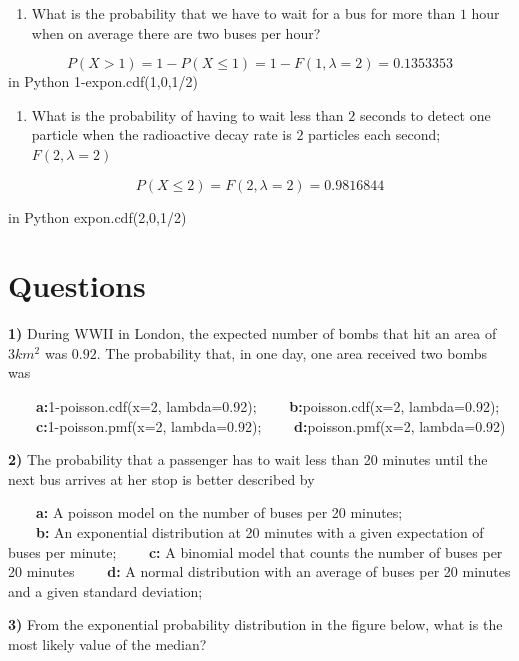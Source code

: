 \documentclass[
]{book}
\providecommand{\tightlist}{%
  \setlength{\itemsep}{0pt}\setlength{\parskip}{0pt}}
\begin{document}
\begin{enumerate}
\def\labelenumi{\arabic{enumi})}
\tightlist
\item
  What is the probability that we have to wait for a bus for more than \(1\) hour when on average there are two buses per hour?
\end{enumerate}

\[P(X > 1)=1-P(X \le 1) = 1-F(1,\lambda=2)=0.1353353\]
in Python 1-expon.cdf(1,0,1/2)

\begin{enumerate}
\def\labelenumi{\arabic{enumi})}
\setcounter{enumi}{1}
\tightlist
\item
  What is the probability of having to wait less than \(2\) seconds to detect one particle when the radioactive decay rate is \(2\) particles each second; \(F(2,\lambda=2)\)
\end{enumerate}

\[P(X \le 2)=F(2,\lambda=2)=0.9816844\]

in Python expon.cdf(2,0,1/2)

\hypertarget{questions-5}{%
\section{Questions}\label{questions-5}}

\textbf{1)} During WWII in London, the expected number of bombs that hit an area of \(3km^2\) was \(0.92\). The probability that, in one day, one area received two bombs was

\textbf{\(\qquad\)a:}1-poisson.cdf(x=2, lambda=0.92);
\textbf{\(\qquad\)b:}poisson.cdf(x=2, lambda=0.92); \textbf{\(\qquad\)c:}1-poisson.pmf(x=2, lambda=0.92); \textbf{\(\qquad\)d:}poisson.pmf(x=2, lambda=0.92)

\textbf{2)} The probability that a passenger has to wait less than 20 minutes until the next bus arrives at her stop is better described by

\textbf{\(\qquad\)a:} A poisson model on the number of buses per 20 minutes;\\
\textbf{\(\qquad\)b:} An exponential distribution at 20 minutes with a given expectation of buses per minute;
\textbf{\(\qquad\)c:} A binomial model that counts the number of buses per 20 minutes
\textbf{\(\qquad\)d:} A normal distribution with an average of buses per 20 minutes and a given standard deviation;

\textbf{3)} From the exponential probability distribution in the figure below, what is the most likely value of the median?
\end{document}
